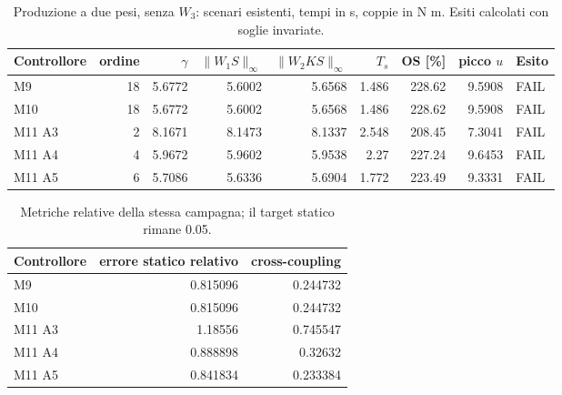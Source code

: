 \begin{table}[htbp]\centering\scriptsize
\begin{tabular}{lrrrrrrrl}\toprule
Controllore & ordine & $\gamma$ & $\|W_1S\|_\infty$ & $\|W_2KS\|_\infty$ & $T_s$ & OS [\%] & picco $u$ & Esito \\
\midrule
M9 & 18 & 5.6772 & 5.6002 & 5.6568 & 1.486 & 228.62 & 9.5908 & FAIL \\
M10 & 18 & 5.6772 & 5.6002 & 5.6568 & 1.486 & 228.62 & 9.5908 & FAIL \\
M11 A3 & 2 & 8.1671 & 8.1473 & 8.1337 & 2.548 & 208.45 & 7.3041 & FAIL \\
M11 A4 & 4 & 5.9672 & 5.9602 & 5.9538 & 2.27 & 227.24 & 9.6453 & FAIL \\
M11 A5 & 6 & 5.7086 & 5.6336 & 5.6904 & 1.772 & 223.49 & 9.3331 & FAIL \\
\bottomrule\end{tabular}
\caption{Produzione a due pesi, senza $W_3$: scenari esistenti, tempi in s, coppie in N m. Esiti calcolati con soglie invariate.}\label{tab:direct-production}\end{table}
\begin{table}[htbp]\centering\small
\begin{tabular}{lrr}\toprule Controllore & errore statico relativo & cross-coupling \\
\midrule
M9 & 0.815096 & 0.244732 \\
M10 & 0.815096 & 0.244732 \\
M11 A3 & 1.18556 & 0.745547 \\
M11 A4 & 0.888898 & 0.32632 \\
M11 A5 & 0.841834 & 0.233384 \\
\bottomrule\end{tabular}\caption{Metriche relative della stessa campagna; il target statico rimane 0.05.}\end{table}

